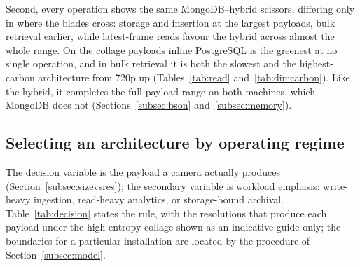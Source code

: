\documentclass[pdflatex,sn-basic]{sn-jnl}%
\begin{document}
{\color{markup}Second, every operation shows the same MongoDB--hybrid scissors, differing only in where the blades cross: storage and insertion at the largest payloads, bulk retrieval earlier, while latest-frame reads favour the hybrid across almost the whole range.} {\color{markup}On the collage payloads inline PostgreSQL is the greenest at no single operation, and in bulk retrieval it is both the slowest and the highest-carbon architecture from 720p up (Tables~\ref{tab:read} and~\ref{tab:dimcarbon}).} {\color{markup}Like the hybrid, it completes the full payload range on both machines, which MongoDB does not (Sections~\ref{subsec:bson} and~\ref{subsec:memory}).}

\subsection{Selecting an architecture by operating regime}\label{subsec:selection}
{\color{markup}The decision variable is the payload a camera actually produces (Section~\ref{subsec:sizevsres}); the secondary variable is workload emphasis: write-heavy ingestion, read-heavy analytics, or storage-bound archival.} {\color{markup}Table~\ref{tab:decision} states the rule, with the resolutions that produce each payload under the high-entropy collage shown as an indicative guide only; the boundaries for a particular installation are located by the procedure of Section~\ref{subsec:model}.}
\end{document}
